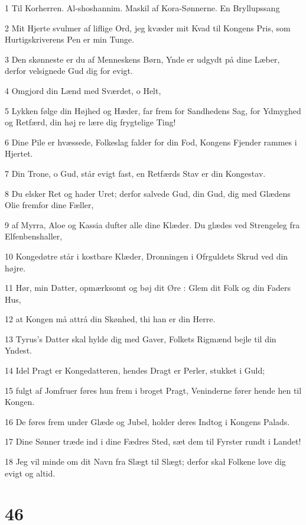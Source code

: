 \par 1 Til Korherren. Al-shoshannim. Maskil af Kora-Sønnerne. En Bryllupssang
\par 2 Mit Hjerte svulmer af liflige Ord, jeg kvæder mit Kvad til Kongens Pris, som Hurtigskriverens Pen er min Tunge.
\par 3 Den skønneste er du af Menneskens Børn, Ynde er udgydt på dine Læber, derfor velsignede Gud dig for evigt.
\par 4 Omgjord din Lænd med Sværdet, o Helt,
\par 5 Lykken følge din Højhed og Hæder, far frem for Sandhedens Sag, for Ydmyghed og Retfærd, din høj re lære dig frygtelige Ting!
\par 6 Dine Pile er hvæssede, Folkeslag falder for din Fod, Kongens Fjender rammes i Hjertet.
\par 7 Din Trone, o Gud, står evigt fast, en Retfærds Stav er din Kongestav.
\par 8 Du elsker Ret og hader Uret; derfor salvede Gud, din Gud, dig med Glædens Olie fremfor dine Fæller,
\par 9 af Myrra, Aloe og Kassia dufter alle dine Klæder. Du glædes ved Strengeleg fra Elfenbenshaller,
\par 10 Kongedøtre står i kostbare Klæder, Dronningen i Ofrguldets Skrud ved din højre.
\par 11 Hør, min Datter, opmærksomt og bøj dit Øre : Glem dit Folk og din Faders Hus,
\par 12 at Kongen må attrå din Skønhed, thi han er din Herre.
\par 13 Tyrus's Datter skal hylde dig med Gaver, Folkets Rigmænd bejle til din Yndest.
\par 14 Idel Pragt er Kongedatteren, hendes Dragt er Perler, stukket i Guld;
\par 15 fulgt af Jomfruer føres hun frem i broget Pragt, Veninderne fører hende hen til Kongen.
\par 16 De føres frem under Glæde og Jubel, holder deres Indtog i Kongens Palads.
\par 17 Dine Sønner træde ind i dine Fædres Sted, sæt dem til Fyrster rundt i Landet!
\par 18 Jeg vil minde om dit Navn fra Slægt til Slægt; derfor skal Folkene love dig evigt og altid.

\chapter{46}

